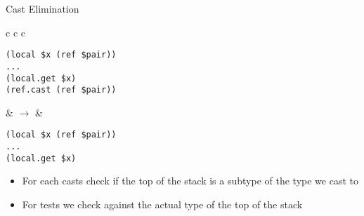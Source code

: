 \documentclass{beamer}
\begin{document}
\begin{frame}[fragile]{Cast Elimination}{}
  \begin{center}
  \begin{tabular}{c c c}
    \begin{minipage}{\widthof{\texttt{(local \$x (ref \$pair))}}}
\begin{verbatim}
(local $x (ref $pair))
...
(local.get $x)
(ref.cast (ref $pair))
\end{verbatim}
\end{minipage}
    &
    $\rightarrow$
    &\begin{minipage}{\widthof{\texttt{(local \$x (ref \$pair))}}}
\begin{verbatim}
(local $x (ref $pair))
...
(local.get $x)

\end{verbatim}
\end{minipage}
  \end{tabular}
  \end{center}
  \vfill
\begin{itemize}
\item For each casts check if the top of the stack is a subtype of the type we
  cast to
\item For tests we check against the actual type of the top of the stack
\end{itemize}
\end{frame}
\end{document}
